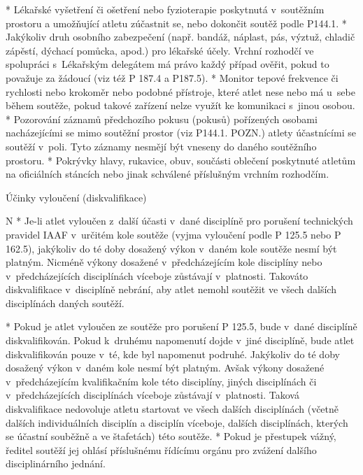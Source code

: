   * Lékařské vyšetření či ošetření nebo fyzioterapie poskytnutá v~soutěžním prostoru a umožňující atletu zúčastnit se, nebo dokončit soutěž podle P144.1.
  * Jakýkoliv druh osobního zabezpečení (např. bandáž, náplast, pás, výztuž, chladič zápěstí, dýchací pomůcka, apod.) pro lékařské účely. Vrchní rozhodčí ve spolupráci s~Lékařským delegátem má právo každý případ ověřit, pokud to považuje za žádoucí (viz též P 187.4 a P187.5).
  * Monitor tepové frekvence či rychlosti nebo krokoměr nebo podobné přístroje, které atlet nese nebo má u~sebe během soutěže, pokud takové zařízení nelze využít ke komunikaci s~jinou osobou.
  * Pozorování záznamů předchozího pokusu (pokusů) pořízených osobami nacházejícími se mimo soutěžní prostor (viz P144.1. POZN.) atlety účastnícími se soutěží v~poli. Tyto záznamy nesmějí být vneseny do daného soutěžního prostoru.
  * Pokrývky hlavy, rukavice, obuv, součásti oblečení poskytnuté atletům na oficiálních stáncích nebo jinak schválené příslušným vrchním rozhodčím.
  \enditems
\enditems

\secc Účinky vyloučení (diskvalifikace)

\begitems \style N
* Je-li atlet vyloučen z~další účasti v~dané disciplíně pro porušení technických pravidel IAAF v~určitém kole soutěže (vyjma vyloučení podle P 125.5 nebo P 162.5), jakýkoliv do té doby dosažený výkon v~daném kole soutěže nesmí být platným. Nicméně výkony dosažené v~předcházejícím kole disciplíny nebo v~předcházejících disciplínách víceboje zůstávají v~platnosti. Takováto diskvalifikace v~disciplíně nebrání, aby atlet nemohl soutěžit ve všech dalších disciplínách daných soutěží.

* Pokud je atlet vyloučen ze soutěže pro porušení P 125.5, bude v~dané disciplíně diskvalifikován. Pokud k~druhému napomenutí dojde v~jiné disciplíně, bude atlet diskvalifikován pouze v~té, kde byl napomenut podruhé. Jakýkoliv do té doby dosažený výkon v~daném kole nesmí být platným. Avšak výkony dosažené v~předcházejícím kvalifikačním kole této disciplíny, jiných disciplínách či v~předcházejících disciplínách víceboje zůstávají v~platnosti. Taková diskvalifikace nedovoluje atletu startovat ve všech dalších disciplínách (včetně dalších individuálních disciplín a disciplín víceboje, dalších disciplínách, kterých se účastní souběžně a ve štafetách) této soutěže.
* Pokud je přestupek vážný, ředitel soutěží jej ohlásí příslušnému řídícímu orgánu pro zvážení dalšího disciplinárního jednání.

